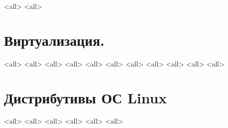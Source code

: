 \mode<all>{}
\mode<all>{}
\section{Виртуализация.}
\mode<all>{}
\mode<all>{}
\mode<all>{}
\mode<all>{}
\mode<all>{}
\mode<all>{}
\mode<all>{}
\mode<all>{}
\mode<all>{}
\mode<all>{}
\mode<all>{}

\section{Дистрибутивы ОС Linux}
\mode<all>{}
\mode<all>{}
\mode<all>{}
\mode<all>{}
\mode<all>{}
\mode<all>{}

\bye
